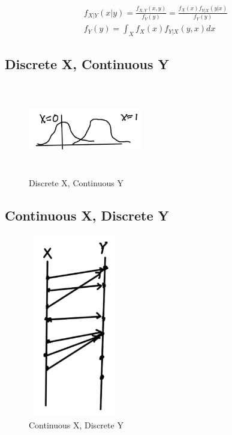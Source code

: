 \documentclass{article}
\begin{document}
\begin{align*}
f_{X|Y}(x|y) = \frac{f_{X,Y}(x,y)}{f_Y(y)}  = \frac{f_X(x) f_{Y|X}(y|x)}{f_Y(y)}\\
f_Y(y) = \int_X f_X(x) f_{Y|X}(y,x)dx
\end{align*}

\subsection{Discrete X, Continuous Y}


\begin{figure}[h]
\centering
\includegraphics[width=5cm, height=4cm]{images/L10/discrete_continuous.jpeg}
\caption{Discrete X, Continuous Y}
\end{figure}

\subsection{Continuous X, Discrete Y}


\begin{figure}[h]
\centering
\includegraphics[width=4cm, height=8cm]{images/L10/continuous_discrete.jpeg}
\caption{Continuous X, Discrete Y}
\end{figure}
\end{document}
